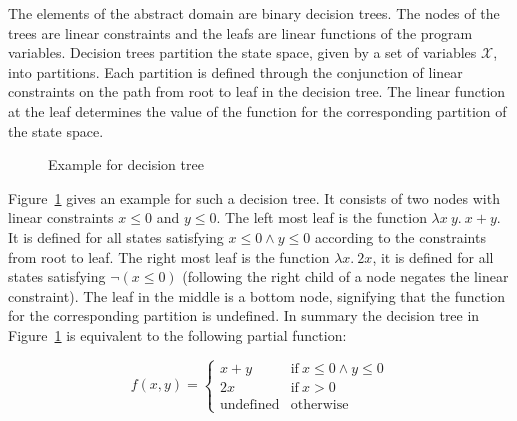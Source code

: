 \documentclass[11pt,a4paper,titlepage]{article}
\theoremstyle{definition}
\begin{document}
The elements of the abstract domain are binary decision trees. The nodes of the trees are linear constraints and the leafs are linear functions
of the program variables. Decision trees partition the state space, given by a set of variables $\mathcal{X}$, into partitions. 
Each partition is defined through the conjunction of linear constraints on the path from root to leaf in the decision tree.
The linear function at the leaf determines the value of the function for the corresponding partition of the state space.\\

\begin{figure}
    \centering
    \caption{Example for decision tree}
    \label{fig:decision_tree_example}
\end{figure}

Figure~\ref{fig:decision_tree_example} gives an example for such a decision tree. 
It consists of two nodes with linear constraints $x \leq 0$ and $y \leq 0$. The left most leaf is the function $\lambda x \ y. \ x + y$. 
It is defined for all states satisfying $x \leq 0 \land y \leq 0$ according to the constraints from root to leaf. 
The right most leaf is the function $\lambda x.\ 2x$, it is defined for all states satisfying $\neg (x \leq 0)$ 
(following the right child of a node negates the linear constraint). The leaf in the middle is a bottom node, 
signifying that the function for the corresponding partition is undefined. 
In summary the decision tree in Figure~\ref{fig:decision_tree_example} is equivalent to the following partial function:

\[
    f(x, y) = \begin{cases}
            x+y                   & \text{if} \ x \leq 0 \land y \leq 0 \\
            2x                   & \text{if} \ x > 0 \\
            \text{undefined}    & \text{otherwise}
        \end{cases}
\]
\end{document}
